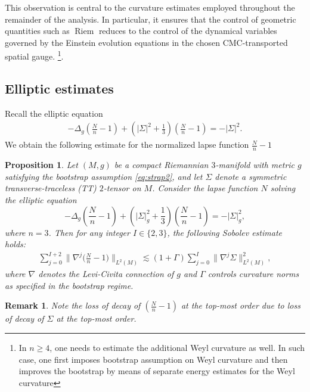 \documentclass{amsart}
\newtheorem{remark}{Remark}
\newtheorem{proposition}{Proposition}[section]
\begin{document}
\noindent This observation is central to the curvature estimates employed throughout the remainder of the analysis. In particular, it ensures that the control of geometric quantities such as $\operatorname{Riem}$ reduces to the control of the dynamical variables governed by the Einstein evolution equations in the chosen CMC-transported spatial gauge.
 \footnote{In $n\geq 4$, one needs to estimate the additional Weyl curvature as well. In such case, one first imposes bootstrap assumption on Weyl curvature and then improves the bootstrap by means of  separate energy estimates for the Weyl curvature}.
\subsection{Elliptic estimates}
\label{ellipticestimates}
\noindent Recall the elliptic equation 
\begin{align}
-\Delta_{g}(\frac{N}{n}-1)+(|\Sigma|^{2}+\frac{1}{3})(\frac{N}{n}-1)=-|\Sigma|^{2}. 
\end{align}
We obtain the following estimate for the normalized lapse function $\frac{N}{n}-1$
\begin{proposition}\label{elliptic}
Let $(M,g)$ be a compact Riemannian $3$-manifold with metric $g$ satisfying the bootstrap assumption \eqref{eq:strap2}, and let $\Sigma$ denote a symmetric transverse-traceless (TT) $2$-tensor on $M$. Consider the lapse function $N$ solving the elliptic equation
\[
-\Delta_g \left(\frac{N}{n} - 1\right) + \left(|\Sigma|_g^2 + \frac{1}{3}\right) \left(\frac{N}{n} - 1\right) = - |\Sigma|_g^2,
\]
where $n=3$. Then for any integer $I \in \{2,3\}$, the following Sobolev estimate holds:
\begin{align}\label{eq:lapse_sobolev_estimate}
\sum_{j=0}^{I+2} \|\nabla^j\big(\frac{N}{n} - 1\big)\|_{L^2(M)} 
\lesssim (1 + \Gamma) \sum_{j=0}^I \|\nabla^j \Sigma\|_{L^2(M)}^2,
\end{align}
where $\nabla$ denotes the Levi-Civita connection of $g$ and $\Gamma$ controls curvature norms as specified in the bootstrap regime.
\end{proposition}
\begin{remark}
Note the loss of decay of $(\frac{N}{n}-1)$ at the top-most order due to loss of decay of $\Sigma$ at the top-most order.     
\end{remark}
\end{document}
